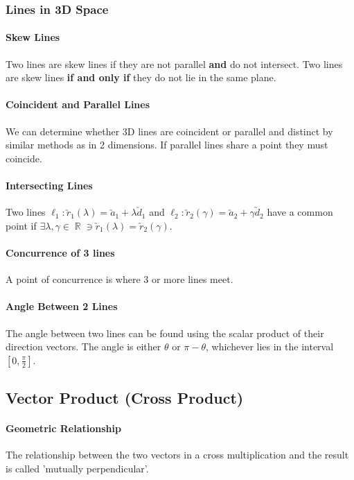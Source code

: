 \documentclass[a4paper,twoside,10pt]{article}
\DeclareMathOperator\R{\mathbb{R}}
\begin{document}
			\subsubsection{Lines in 3D Space}
				\paragraph{Skew Lines} Two lines are skew lines if they are not parallel \textbf{and} do not intersect. Two lines are skew lines \textbf{if and only if} they do not lie in the same plane.
				
				\paragraph{Coincident and Parallel Lines} We can determine whether 3D lines are coincident or parallel and distinct by similar methods as in 2 dimensions. If parallel lines share a point they must coincide.
				
				\paragraph{Intersecting Lines} Two lines $\ell_1:\utilde{r}_1(\lambda)=\utilde{a}_1+\lambda\utilde{d}_1$ and $\ell_2:\utilde{r}_2(\gamma)=\utilde{a}_2+\gamma\utilde{d}_2$ have a common point if $\exists\lambda,\gamma\in\R\ni\utilde{r}_1(\lambda)=\utilde{r}_2(\gamma)$.
				
				\paragraph{Concurrence of 3 lines} A point of concurrence is where 3 or more lines meet.
				
				\paragraph{Angle Between 2 Lines} The angle between two lines can be found using the scalar product of their direction vectors. The angle is either $\theta$ or $\pi-\theta$, whichever lies in the interval $[0,\frac{\pi}{2}]$.
		\subsection{Vector Product (Cross Product)}
			\paragraph{Geometric Relationship} The relationship between the two vectors in a cross multiplication and the result is called 'mutually perpendicular'.
\end{document}
